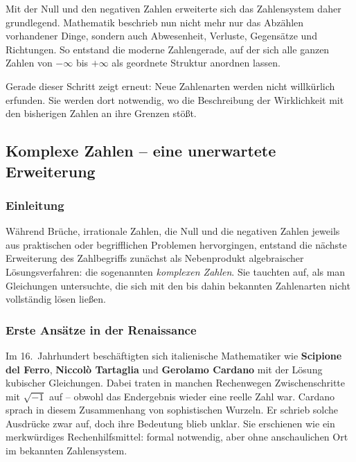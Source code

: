 Mit der Null und den negativen Zahlen
erweiterte sich das Zahlensystem daher grundlegend.
Mathematik beschrieb nun nicht mehr nur das Abzählen vorhandener Dinge,
sondern auch Abwesenheit, Verluste, Gegensätze und Richtungen.
So entstand die moderne Zahlengerade,
auf der sich alle ganzen Zahlen von $-\infty$ bis $+\infty$
als geordnete Struktur anordnen lassen.

Gerade dieser Schritt zeigt erneut:
Neue Zahlenarten werden nicht willkürlich erfunden.
Sie werden dort notwendig,
wo die Beschreibung der Wirklichkeit mit den bisherigen Zahlen an ihre Grenzen stößt.
\newpage
\noindent
\subsection{Komplexe Zahlen -- eine unerwartete Erweiterung}
\label{sec:2.4_komplexe}

\subsubsection*{Einleitung}
Während Brüche, irrationale Zahlen, die Null und die negativen Zahlen jeweils aus praktischen
oder begrifflichen Problemen hervorgingen,
entstand die nächste Erweiterung des Zahlbegriffs zunächst
als Nebenprodukt algebraischer Lösungsverfahren:
die sogenannten \emph{komplexen Zahlen}.
Sie tauchten auf, als man Gleichungen untersuchte,
die sich mit den bis dahin bekannten Zahlenarten nicht vollständig lösen ließen.

\subsubsection*{Erste Ansätze in der Renaissance}
Im 16.~Jahrhundert beschäftigten sich italienische Mathematiker wie
\textbf{Scipione del Ferro},
\textbf{Niccolò Tartaglia} und
\textbf{Gerolamo Cardano}
mit der Lösung kubischer Gleichungen.
Dabei traten in manchen Rechenwegen Zwischenschritte mit $\sqrt{-1}$ auf --
obwohl das Endergebnis wieder eine reelle Zahl war.
Cardano sprach in diesem Zusammenhang von \glqq sophistischen Wurzeln\grqq.
Er schrieb solche Ausdrücke zwar auf,
doch ihre Bedeutung blieb unklar.
Sie erschienen wie ein merkwürdiges Rechenhilfsmittel:
formal notwendig, aber ohne anschaulichen Ort im bekannten Zahlensystem.

